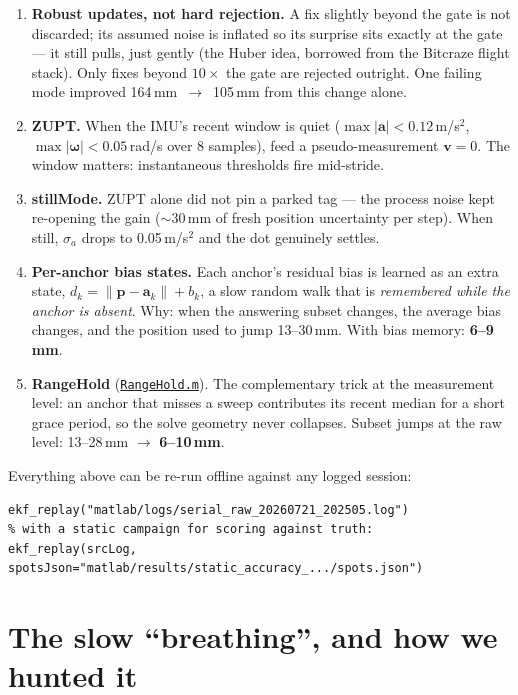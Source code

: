 \documentclass[11pt,a4paper]{article}
\newcommand{\gh}[2]{\href{https://github.com/AdershM-2/UWB_3/blob/main/#1}{\texttt{#2}}}
\begin{document}
\begin{enumerate}
\item \textbf{Robust updates, not hard rejection.} A fix slightly beyond the gate
      is not discarded; its assumed noise is inflated so its surprise sits exactly
      at the gate --- it still pulls, just gently (the Huber idea, borrowed from
      the Bitcraze flight stack). Only fixes beyond $10\times$ the gate are
      rejected outright. One failing mode improved 164\,mm~$\to$~105\,mm from this
      change alone.
\item \textbf{ZUPT.} When the IMU's recent window is quiet
      ($\max|\mathbf{a}| < 0.12$\,m/s$^2$, $\max|\boldsymbol\omega| < 0.05$\,rad/s
      over 8 samples), feed a pseudo-measurement $\mathbf{v} = 0$. The window
      matters: instantaneous thresholds fire mid-stride.
\item \textbf{stillMode.} ZUPT alone did not pin a parked tag --- the process
      noise kept re-opening the gain ($\sim$30\,mm of fresh position uncertainty
      per step). When still, $\sigma_a$ drops to 0.05\,m/s$^2$ and the dot
      genuinely settles.
\item \textbf{Per-anchor bias states.} Each anchor's residual bias is learned as an
      extra state, $d_k = \lVert\mathbf{p}-\mathbf{a}_k\rVert + b_k$, a slow random
      walk that is \emph{remembered while the anchor is absent}. Why: when the
      answering subset changes, the average bias changes, and the position used to
      jump 13--30\,mm. With bias memory: \textbf{6--9\,mm}.
\item \textbf{RangeHold} (\gh{matlab/+dune/RangeHold.m}{RangeHold.m}). The
      complementary trick at the measurement level: an anchor that misses a sweep
      contributes its recent median for a short grace period, so the solve
      geometry never collapses. Subset jumps at the raw level: 13--28\,mm $\to$
      \textbf{6--10\,mm}.
\end{enumerate}

\begin{tryit}
Everything above can be re-run offline against any logged session:
\begin{lstlisting}
ekf_replay("matlab/logs/serial_raw_20260721_202505.log")
% with a static campaign for scoring against truth:
ekf_replay(srcLog, spotsJson="matlab/results/static_accuracy_.../spots.json")
\end{lstlisting}
\end{tryit}

\section{The slow ``breathing'', and how we hunted it}
\label{sec:breathing}
\end{document}
